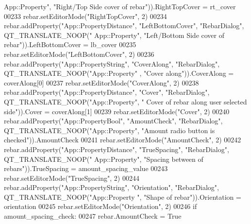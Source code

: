 \begin{DoxyCode}
{      App::Property"}, \textcolor{stringliteral}{"Right/Top Side cover of rebar"})).RightTopCover = rt\_cover
00233     rebar.setEditorMode(\textcolor{stringliteral}{"RightTopCover"}, 2)
00234     rebar.addProperty(\textcolor{stringliteral}{"App::PropertyDistance"}, \textcolor{stringliteral}{"LeftBottomCover"}, \textcolor{stringliteral}{"RebarDialog"}, QT\_TRANSLATE\_NOOP(\textcolor{stringliteral}{"
      App::Property"}, \textcolor{stringliteral}{"Left/Bottom Side cover of rebar"})).LeftBottomCover = lb\_cover
00235     rebar.setEditorMode(\textcolor{stringliteral}{"LeftBottomCover"}, 2)
00236     rebar.addProperty(\textcolor{stringliteral}{"App::PropertyString"}, \textcolor{stringliteral}{"CoverAlong"}, \textcolor{stringliteral}{"RebarDialog"}, QT\_TRANSLATE\_NOOP(\textcolor{stringliteral}{"App::Property"}
      , \textcolor{stringliteral}{"Cover along"})).CoverAlong = coverAlong[0]
00237     rebar.setEditorMode(\textcolor{stringliteral}{"CoverAlong"}, 2)
00238     rebar.addProperty(\textcolor{stringliteral}{"App::PropertyDistance"}, \textcolor{stringliteral}{"Cover"}, \textcolor{stringliteral}{"RebarDialog"}, QT\_TRANSLATE\_NOOP(\textcolor{stringliteral}{"App::Property"}, \textcolor{stringliteral}{"
      Cover of rebar along user selected side"})).Cover = coverAlong[1]
00239     rebar.setEditorMode(\textcolor{stringliteral}{"Cover"}, 2)
00240     rebar.addProperty(\textcolor{stringliteral}{"App::PropertyBool"}, \textcolor{stringliteral}{"AmountCheck"}, \textcolor{stringliteral}{"RebarDialog"}, QT\_TRANSLATE\_NOOP(\textcolor{stringliteral}{"App::Property"},
       \textcolor{stringliteral}{"Amount radio button is checked"})).AmountCheck
00241     rebar.setEditorMode(\textcolor{stringliteral}{"AmountCheck"}, 2)
00242     rebar.addProperty(\textcolor{stringliteral}{"App::PropertyDistance"}, \textcolor{stringliteral}{"TrueSpacing"}, \textcolor{stringliteral}{"RebarDialog"}, QT\_TRANSLATE\_NOOP(\textcolor{stringliteral}{"
      App::Property"}, \textcolor{stringliteral}{"Spacing between of rebars"})).TrueSpacing = amount\_spacing\_value
00243     rebar.setEditorMode(\textcolor{stringliteral}{"TrueSpacing"}, 2)
00244     rebar.addProperty(\textcolor{stringliteral}{"App::PropertyString"}, \textcolor{stringliteral}{"Orientation"}, \textcolor{stringliteral}{"RebarDialog"}, QT\_TRANSLATE\_NOOP(\textcolor{stringliteral}{"App::Property
      "}, \textcolor{stringliteral}{"Shape of rebar"})).Orientation = orientation
00245     rebar.setEditorMode(\textcolor{stringliteral}{"Orientation"}, 2)
00246     \textcolor{keywordflow}{if} amount\_spacing\_check:
00247         rebar.AmountCheck = \textcolor{keyword}{True}

\end{DoxyCode}
